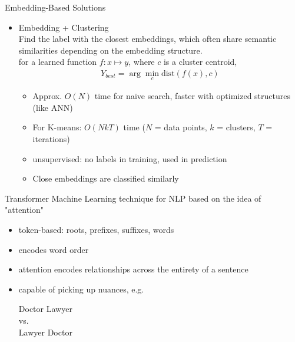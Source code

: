 \documentclass{beamer}
\begin{document}
\begin{frame}{Embedding-Based Solutions}
    \begin{itemize}
        \item Embedding + Clustering
        \\Find the label with the closest embeddings, which often share semantic similarities depending on the embedding structure.
        \\for a learned function $f: x \mapsto y $, where $c$ is a cluster centroid, 
        \begin{align*}
           Y_{best} = \arg\min_{c} \text{dist}(f(x), c)
        \end{align*}
        \begin{itemize}
            \item Approx. $O(N)$ time for naive search, faster with optimized structures (like ANN)
            \item For K-means: $O(NkT)$ time ($N$ = data points, $k$ = clusters, $T$ = iterations)
            \item unsupervised: no labels in training, used in prediction
            \item Close embeddings are classified similarly 
        \end{itemize}
    \end{itemize}
\end{frame}




\begin{frame}{Transformer}
Machine Learning technique for NLP based on the idea of "attention"
\begin{itemize}
    \item token-based: roots, prefixes, suffixes, words
    \item encodes word order
    \item attention encodes relationships across the entirety of a sentence
    \item capable of picking up nuances, e.g.
    \begin{center}
        Doctor Lawyer\\
        vs.\\
        Lawyer Doctor
    \end{center}
\end{itemize}
\end{frame}
\end{document}
